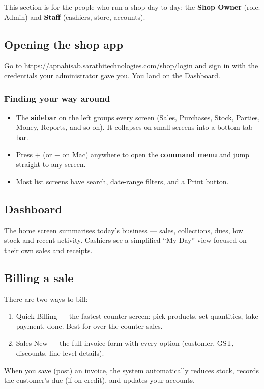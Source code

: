 \documentclass[11pt,a4paper]{article}
\newcommand{\role}[1]{\textbf{\color{brand}#1}}
\newcommand{\menu}[1]{\textsf{#1}}
\newcommand{\key}[1]{\fbox{\small\texttt{#1}}}
\begin{document}
This section is for the people who run a shop day to day: the \role{Shop Owner}
(role: Admin) and \role{Staff} (cashiers, store, accounts).

\subsection{Opening the shop app}
Go to \url{https://apnahisab.sarathitechnologies.com/shop/login} and sign in with
the credentials your administrator gave you. You land on the \menu{Dashboard}.

\subsubsection{Finding your way around}
\begin{itemize}
  \item The \textbf{sidebar} on the left groups every screen (Sales, Purchases,
        Stock, Parties, Money, Reports, and so on). It collapses on small
        screens into a bottom tab bar.
  \item Press \key{Ctrl}+\key{K} (or \key{Cmd}+\key{K} on Mac) anywhere to open
        the \textbf{command menu} and jump straight to any screen.
  \item Most list screens have search, date-range filters, and a
        \menu{Print} button.
\end{itemize}

\subsection{Dashboard}
The home screen summarises today's business --- sales, collections, dues, low
stock and recent activity. Cashiers see a simplified ``My Day'' view focused on
their own sales and receipts.

\subsection{Billing a sale}
There are two ways to bill:
\begin{enumerate}
  \item \menu{Quick Billing} --- the fastest counter screen: pick products, set
        quantities, take payment, done. Best for over-the-counter sales.
  \item \menu{Sales \textrightarrow{} New} --- the full invoice form with every
        option (customer, GST, discounts, line-level details).
\end{enumerate}
When you save (post) an invoice, the system automatically reduces stock, records
the customer's due (if on credit), and updates your accounts.
\end{document}
